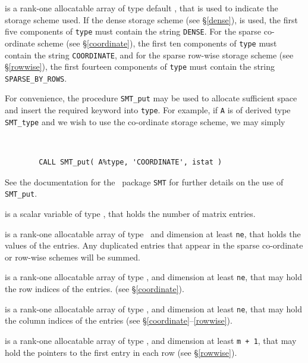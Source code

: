 \documentclass{galahad}
\begin{document}
\begin{description}

 
 
 is a rank-one allocatable array of type default \character, that
is used to indicate the storage scheme used. If the dense storage scheme 
(see \S\ref{dense}), is used, 
the first five components of {\tt type} must contain the
string {\tt DENSE}.
For the sparse co-ordinate scheme (see \S\ref{coordinate}), 
the first ten components of {\tt type} must contain the
string {\tt COORDINATE},  and
for the sparse row-wise storage scheme (see \S\ref{rowwise}),
the first fourteen components of {\tt type} must contain the
string {\tt SPARSE\_BY\_ROWS}.

For convenience, the procedure {\tt SMT\_put} 
may be used to allocate sufficient space and insert the required keyword
into {\tt type}.
For example, if {\tt A} is of derived type {\tt SMT\_type}
and we wish to use the co-ordinate storage scheme, we may simply
{\tt 
\begin{verbatim}
        CALL SMT_put( A%type, 'COORDINATE', istat )
\end{verbatim}
}
\noindent
See the documentation for the \galahad\ package {\tt SMT} 
for further details on the use of {\tt SMT\_put}.

 is a scalar variable of type \integer, that
holds the number of matrix entries.

 is a rank-one allocatable array of type \realdp\, 
and dimension at least {\tt ne}, that holds the values of the entries. 
Any duplicated entries that appear in the sparse 
co-ordinate or row-wise schemes will be summed. 

 is a rank-one allocatable array of type \integer, 
and dimension at least {\tt ne}, that may hold the row indices of the entries. 
(see \S\ref{coordinate}).

 is a rank-one allocatable array of type \integer, 
and dimension at least {\tt ne}, that may hold the column indices of the entries
(see \S\ref{coordinate}--\ref{rowwise}).

 is a rank-one allocatable array of type \integer, 
and dimension at least {\tt m + 1}, that may hold the pointers to
the first entry in each row (see \S\ref{rowwise}).

\end{description}
\end{document}
